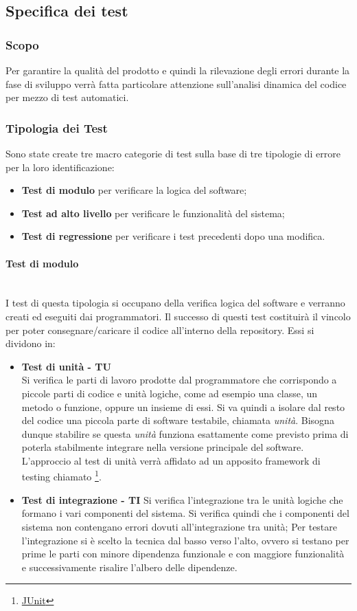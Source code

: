 \subsection{Specifica dei test}
\label{sec:specifica_test}
\subsubsection{Scopo}
\label{sec:test_scopo}
Per garantire la qualità del prodotto e quindi la rilevazione degli errori durante la fase di sviluppo verrà fatta particolare attenzione sull'analisi dinamica del codice per mezzo di test automatici.
\subsubsection{Tipologia dei Test}
\label{sec:tipologia_test}
Sono state create tre macro categorie di test sulla base di tre tipologie di errore per la loro identificazione:
\begin{itemize}
	\item \textbf{Test di modulo} per verificare la logica del software;
	\item \textbf{Test ad alto livello} per verificare le funzionalità del sistema;
	\item \textbf{Test di regressione} per verificare i test precedenti dopo una modifica.
\end{itemize} 
\paragraph{Test di modulo}\mbox{}\\[0.4cm]
I test di questa tipologia si occupano della verifica logica del software e verranno creati ed eseguiti dai programmatori. Il successo di questi test costituirà il vincolo per poter consegnare/caricare il codice all'interno della repository.
Essi si dividono in:
\begin{itemize}
	\item \textbf{Test di unità - TU}\\
	Si verifica le parti di lavoro prodotte dal programmatore che corrispondo a piccole parti di codice e unità logiche, come ad esempio una classe, un metodo o funzione, oppure un insieme di essi.
	Si va quindi a isolare dal resto del codice una piccola parte di software testabile, chiamata \textit{unità}. Bisogna dunque stabilire se questa \textit{unità} funziona esattamente come previsto prima di poterla stabilmente integrare nella versione principale del software. L'approccio al test di unità verrà affidato ad un apposito framework di testing chiamato \footnote{\href{https://junit.org/junit5/}{JUnit}}.
	\item \textbf{Test di integrazione - TI}
	Si verifica l'integrazione tra le unità logiche che formano i vari componenti del sistema. Si verifica quindi che i componenti del sistema non contengano errori dovuti all'integrazione tra unità;
	Per testare l'integrazione si è scelto la tecnica dal basso verso l'alto, ovvero si testano per prime le parti con minore dipendenza funzionale e con maggiore funzionalità e successivamente risalire l'albero delle dipendenze.	
\end{itemize} 

